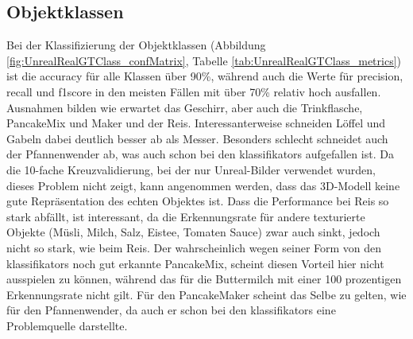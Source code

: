 \subsection{Objektklassen}

Bei der Klassifizierung der Objektklassen (Abbildung \ref{fig:UnrealRealGTClass_confMatrix}, Tabelle \ref{tab:UnrealRealGTClass_metrics}) ist die \gls{accuracy} für alle Klassen über 90\%, während auch die Werte für \gls{precision}, \gls{recall} und \gls{f1score} in den meisten Fällen mit über 70\% relativ hoch ausfallen. Ausnahmen bilden wie erwartet das Geschirr, aber auch die Trinkflasche, PancakeMix und Maker und der Reis. Interessanterweise schneiden Löffel und Gabeln dabei deutlich besser ab als Messer. Besonders schlecht schneidet auch der Pfannenwender ab, was auch schon bei den \glspl{klassifikator} aufgefallen ist. Da die 10-fache Kreuzvalidierung, bei der nur Unreal-Bilder verwendet wurden, dieses Problem nicht zeigt, kann angenommen werden, dass das 3D-Modell keine gute Repräsentation des echten Objektes ist. Dass die Performance bei Reis so stark abfällt, ist interessant, da die Erkennungsrate für andere texturierte Objekte (Müsli, Milch, Salz, Eistee, Tomaten Sauce) zwar auch sinkt, jedoch nicht so stark, wie beim Reis. Der wahrscheinlich wegen seiner Form von den \glspl{klassifikator} noch gut erkannte PancakeMix, scheint diesen Vorteil hier nicht ausspielen zu können, während das für die Buttermilch mit einer 100 prozentigen Erkennungsrate nicht gilt. Für den PancakeMaker scheint das Selbe zu gelten, wie für den Pfannenwender, da auch er schon bei den \glspl{klassifikator} eine Problemquelle darstellte. 

